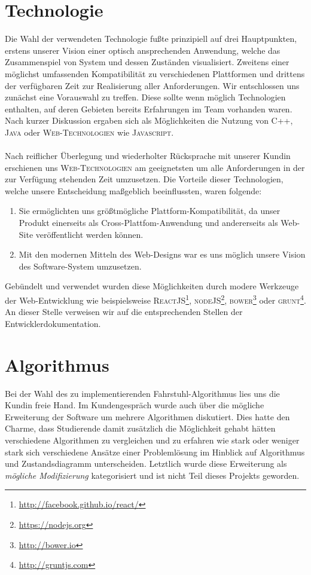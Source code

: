 \section{Technologie}
Die Wahl der verwendeten Technologie fußte prinzipiell auf drei Hauptpunkten, erstens unserer Vision einer optisch ansprechenden Anwendung, welche das Zusammenspiel von System und dessen Zuständen visualisiert. Zweitens einer möglichst umfassenden Kompatibilität zu verschiedenen Plattformen und drittens der verfügbaren Zeit zur Realisierung aller Anforderungen. Wir entschlossen uns zunächst eine Vorauswahl zu treffen. Diese sollte wenn möglich Technologien enthalten, auf deren Gebieten bereits Erfahrungen im Team vorhanden waren. Nach kurzer Diskussion ergaben sich als Möglichkeiten die Nutzung von \textsc{C++}, \textsc{Java} oder \textsc{Web-Technologien} wie \textsc{Javascript}.

\paragraph*{}Nach reiflicher Überlegung und wiederholter Rücksprache mit unserer Kundin erschienen uns \textsc{Web-Technologien} am geeignetsten um alle Anforderungen in der zur Verfügung stehenden Zeit umzusetzen. Die Vorteile dieser Technologien, welche unsere Entscheidung maßgeblich beeinflussten, waren folgende:

\begin{enumerate}
	\item Sie ermöglichten uns größtmögliche Plattform-Kompa\-tibilität, da unser Produkt einerseits als Cross-Plattfom-Anwendung und andererseits als Web-Site veröffentlicht werden können.
	\item Mit den modernen Mitteln des Web-Designs war es uns möglich unsere Vision des Software-System umzusetzen.
\end{enumerate}

Gebündelt und verwendet wurden diese Möglichkeiten durch modere Werkzeuge der Web-Entwicklung wie beispielsweise \textsc{ReactJS}\footnote{\url{http://facebook.github.io/react/}}, \textsc{nodeJS}\footnote{\url{https://nodejs.org}}, \textsc{bower}\footnote{\url{http://bower.io}} oder \textsc{grunt}\footnote{\url{http://gruntjs.com}}. An dieser Stelle verweisen wir auf die entsprechenden Stellen der Entwicklerdokumentation.

\section{Algorithmus}
\label{alg}
Bei der Wahl des zu implementierenden Fahrstuhl-Algorithmus lies uns die Kundin freie Hand. Im Kundengespräch wurde auch über die mögliche Erweiterung der Software um mehrere Algorithmen diskutiert. Dies hatte den Charme, dass Studierende damit zusätzlich die Möglichkeit gehabt hätten verschiedene Algorithmen zu vergleichen und zu erfahren wie stark oder weniger stark sich verschiedene Ansätze einer Problemlösung im Hinblick auf Algorithmus und Zustandsdiagramm unterscheiden. Letztlich wurde diese Erweiterung als \textit{mögliche Modifizierung} kategorisiert und ist nicht Teil dieses Projekts geworden.

